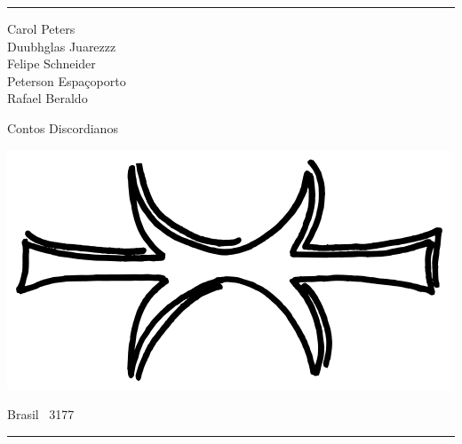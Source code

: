 \thispagestyle{empty}

\hrule

\begin{center}
{\scriptsize
Carol Peters\\
Duubhglas Juarezzz\\
Felipe Schneider\\
Peterson Espaçoporto\\
Rafael Beraldo\\
}
\vspace{.5cm}

{\Large Contos Discordianos}

\vspace{2cm}

\includegraphics[scale=.35]{eris_hand}

\vfill

Brasil \textperiodcentered\ 3177
\vspace{.5em}
\hrule

\end{center}
\newpage


